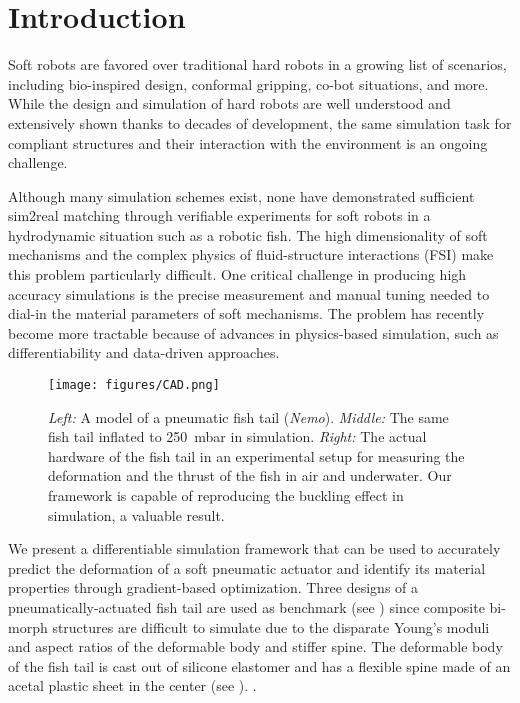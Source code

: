 \section{Introduction}

Soft robots are favored over traditional hard robots in a growing list of scenarios, including bio-inspired design, conformal gripping, co-bot situations, and more. While the design and simulation of hard robots are well understood and extensively shown thanks to decades of development, the same simulation task for compliant structures and their interaction with the environment is an ongoing challenge. 

Although many simulation schemes exist, none have demonstrated sufficient sim2real matching through verifiable experiments for soft robots in a hydrodynamic situation such as a robotic fish. The high dimensionality of soft mechanisms and the complex physics of fluid-structure interactions (FSI) make this problem particularly difficult. One critical challenge in producing high accuracy simulations is the precise measurement and manual tuning needed to dial-in the material parameters of soft mechanisms. The problem has recently become more tractable because of advances in physics-based simulation, such as differentiability and data-driven approaches. 

\begin{figure}[tb]
    \centering
    \texttt{[image: figures/CAD.png]}
    \caption{\textit{Left:} A model of a pneumatic fish tail (\emph{Nemo}). \textit{Middle:} The same fish tail inflated to \SI{250}{mbar} in simulation. \textit{Right:} The actual hardware of the fish tail in an experimental setup for measuring the deformation and the thrust of the fish in air and underwater. Our framework is capable of reproducing the buckling effect in simulation, a valuable result.}
    \label{fig:pneumatic_fish_tail}
    \vspace{-8pt}
\end{figure}

We present a differentiable simulation framework that can be used to accurately predict the deformation of a soft pneumatic actuator and identify its material properties through gradient-based optimization. Three designs of a pneumatically-actuated fish tail are used as benchmark (see ) since composite bi-morph structures are difficult to simulate due to the disparate Young's moduli and aspect ratios of the deformable body and stiffer spine. The deformable body of the fish tail is cast out of silicone elastomer and has a flexible spine made of an acetal plastic sheet in the center (see ). .

